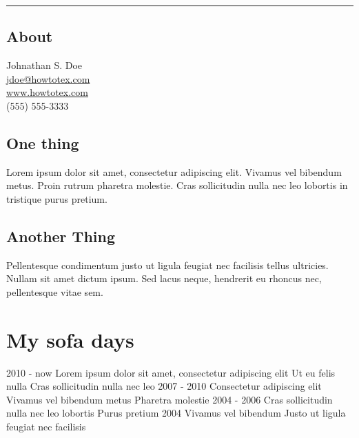 \documentclass[]{viccuad-cv}
\begin{document}




\begin{flushright}
    \rule{2.6cm}{3.2cm}%
    \subsection{About}
        Johnathan S. Doe \\
        \url{jdoe@howtotex.com}  \\
        \url{www.howtotex.com} \\
        (555) 555-3333
    \subsection{One thing}
	 Lorem ipsum dolor sit amet, consectetur adipiscing elit. Vivamus vel bibendum metus. Proin rutrum pharetra molestie. Cras sollicitudin nulla nec leo lobortis in tristique purus pretium.
    \subsection{Another Thing}
	Pellentesque condimentum justo ut ligula feugiat nec facilisis tellus ultricies. Nullam sit amet dictum ipsum. Sed lacus neque, hendrerit eu rhoncus nec, pellentesque vitae sem.

\end{flushright}

\framebreak

 
\section{My sofa days}
    \begin{entrylistdated}
      \entrydated
        {2010 - now}
        {Lorem ipsum dolor sit amet, consectetur adipiscing elit}
        {Ut eu felis nulla}
        {Cras sollicitudin nulla nec leo}
      \entrydated
        {2007 - 2010}
        {Consectetur adipiscing elit}
        {Vivamus vel bibendum metus}
        {Pharetra molestie}
      \entrydated
        {2004 - 2006}
        {Cras sollicitudin nulla nec leo lobortis}
        {}
        {Purus pretium} 
      \entrydated
        {2004}
        {Vivamus vel bibendum}
        {Justo ut ligula feugiat nec facilisis}
        {}
    \end{entrylistdated}
\end{document}
